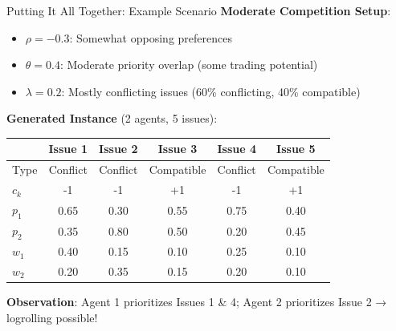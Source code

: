 \documentclass{beamer}
\begin{document}
\begin{frame}{Putting It All Together: Example Scenario}
\textbf{Moderate Competition Setup}:
\begin{itemize}
    \item $\rho = -0.3$: Somewhat opposing preferences
    \item $\theta = 0.4$: Moderate priority overlap (some trading potential)
    \item $\lambda = 0.2$: Mostly conflicting issues (60\% conflicting, 40\% compatible)
\end{itemize}

\vspace{0.5cm}

\textbf{Generated Instance} (2 agents, 5 issues):

\begin{center}
\small
\begin{tabular}{lccccc}
\hline
 & \textbf{Issue 1} & \textbf{Issue 2} & \textbf{Issue 3} & \textbf{Issue 4} & \textbf{Issue 5} \\
\hline
Type & Conflict & Conflict & Compatible & Conflict & Compatible \\
$c_k$ & -1 & -1 & +1 & -1 & +1 \\
\hline
$p_1$ & 0.65 & 0.30 & 0.55 & 0.75 & 0.40 \\
$p_2$ & 0.35 & 0.80 & 0.50 & 0.20 & 0.45 \\
\hline
$w_1$ & 0.40 & 0.15 & 0.10 & 0.25 & 0.10 \\
$w_2$ & 0.20 & 0.35 & 0.15 & 0.20 & 0.10 \\
\hline
\end{tabular}
\end{center}

\vspace{0.3cm}

\textbf{Observation}: Agent 1 prioritizes Issues 1 \& 4; Agent 2 prioritizes Issue 2 → logrolling possible!
\end{frame}
\end{document}
